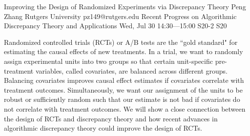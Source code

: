 \begin{talk}
  {Improving the Design of Randomized Experiments via Discrepancy Theory}%
  {Peng Zhang}%
  {Rutgers University}%
  {pz149@rutgers.edu}%
  {Recent Progress on Algorithmic Discrepancy Theory and Applications}%
  {}%
  {Wed, Jul 30 14:30---15:00}%
  {S20-2}%
  {S20}%
    
   
Randomized controlled trials (RCTs) or A/B tests are the ``gold standard" for estimating the causal effects of new treatments. In a trial, we want to randomly assign experimental units into two groups so that certain unit-specific pre-treatment variables, called covariates, are balanced across different groups. Balancing covariates improves causal effect estimates if covariates correlate with treatment outcomes. Simultaneously, we want our assignment of the units to be robust or sufficiently random such that our estimate is not bad if covariates do not correlate with treatment outcomes. We will show a close connection between the design of RCTs and discrepancy theory and how recent advances in algorithmic discrepancy theory could improve the design of RCTs.

\medskip


\end{talk}

